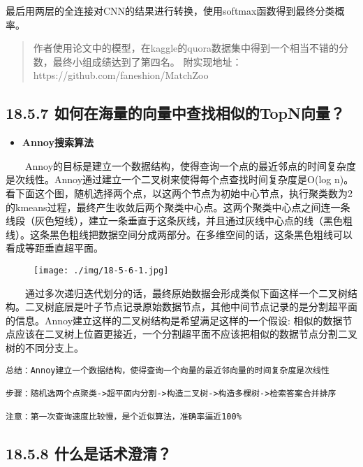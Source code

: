 最后用两层的全连接对CNN的结果进行转换，使用softmax函数得到最终分类概率。

\begin{quote}
作者使用论文中的模型，在kaggle的quora数据集中得到一个相当不错的分数，最终小组成绩达到了第四名。
附实现地址：https://github.com/faneshion/MatchZoo
\end{quote}

\subsection{18.5.7
如何在海量的向量中查找相似的TopN向量？}\label{ux5982ux4f55ux5728ux6d77ux91cfux7684ux5411ux91cfux4e2dux67e5ux627eux76f8ux4f3cux7684topnux5411ux91cf}

\begin{itemize}
\item
  \textbf{Annoy搜索算法}
\end{itemize}

  Annoy的目标是建立一个数据结构，使得查询一个点的最近邻点的时间复杂度是次线性。Annoy通过建立一个二叉树来使得每个点查找时间复杂度是O(log
n)。
看下面这个图，随机选择两个点，以这两个节点为初始中心节点，执行聚类数为2的kmeans过程，最终产生收敛后两个聚类中心点。这两个聚类中心点之间连一条线段（灰色短线），建立一条垂直于这条灰线，并且通过灰线中心点的线（黑色粗线）。这条黑色粗线把数据空间分成两部分。在多维空间的话，这条黑色粗线可以看成等距垂直超平面。

\begin{figure}
\centering
\texttt{[image: ./img/18-5-6-1.jpg]}
\caption{}
\end{figure}

  通过多次递归迭代划分的话，最终原始数据会形成类似下面这样一个二叉树结构。二叉树底层是叶子节点记录原始数据节点，其他中间节点记录的是分割超平面的信息。Annoy建立这样的二叉树结构是希望满足这样的一个假设:
相似的数据节点应该在二叉树上位置更接近，一个分割超平面不应该把相似的数据节点分割二叉树的不同分支上。

\begin{verbatim}
总结：Annoy建立一个数据结构，使得查询一个向量的最近邻向量的时间复杂度是次线性

步骤：随机选两个点聚类->超平面内分割->构造二叉树->构造多棵树->检索答案合并排序

注意：第一次查询速度比较慢，是个近似算法，准确率逼近100%
\end{verbatim}

\subsection{18.5.8
什么是话术澄清？}\label{ux4ec0ux4e48ux662fux8bddux672fux6f84ux6e05}

